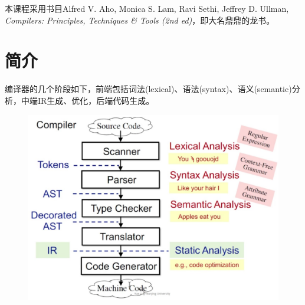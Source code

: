 
本课程采用书目Alfred V. Aho, Monica S. Lam, Ravi Sethi, Jeffrey D. Ullman, \emph{Compilers: Principles, Techniques \& Tools (2nd ed)}，即大名鼎鼎的龙书。

\section{简介}
编译器的几个阶段如下，前端包括词法(lexical)、语法(syntax)、语义(semantic)分析，中端IR生成、优化，后端代码生成。
\begin{figure}[H]
\centering
\includegraphics[width=0.6\linewidth]{fig/compiler_flow.jpg}
\end{figure}